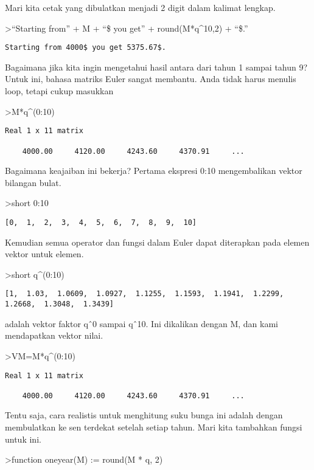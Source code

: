 \documentclass[
]{book}
\begin{document}
Mari kita cetak yang dibulatkan menjadi 2 digit dalam kalimat lengkap.

\textgreater{}``Starting from'' + M + ``\$ you get'' + round(M*q\^{}10,2) + ``\$.''

\begin{verbatim}
Starting from 4000$ you get 5375.67$.
\end{verbatim}

Bagaimana jika kita ingin mengetahui hasil antara dari tahun 1 sampai tahun 9? Untuk ini, bahasa matriks Euler sangat membantu. Anda tidak harus menulis loop, tetapi cukup masukkan

\textgreater M*q\^{}(0:10)

\begin{verbatim}
Real 1 x 11 matrix

    4000.00     4120.00     4243.60     4370.91     ...
\end{verbatim}

Bagaimana keajaiban ini bekerja? Pertama ekspresi 0:10 mengembalikan vektor bilangan bulat.

\textgreater short 0:10

\begin{verbatim}
[0,  1,  2,  3,  4,  5,  6,  7,  8,  9,  10]
\end{verbatim}

Kemudian semua operator dan fungsi dalam Euler dapat diterapkan pada elemen vektor untuk elemen.

\textgreater short q\^{}(0:10)

\begin{verbatim}
[1,  1.03,  1.0609,  1.0927,  1.1255,  1.1593,  1.1941,  1.2299,
1.2668,  1.3048,  1.3439]
\end{verbatim}

adalah vektor faktor qˆ0 sampai qˆ10. Ini dikalikan dengan M, dan kami mendapatkan vektor nilai.

\textgreater VM=M*q\^{}(0:10)

\begin{verbatim}
Real 1 x 11 matrix

    4000.00     4120.00     4243.60     4370.91     ...
\end{verbatim}

Tentu saja, cara realistis untuk menghitung suku bunga ini adalah dengan membulatkan ke sen terdekat setelah setiap tahun. Mari kita tambahkan fungsi untuk ini.

\textgreater function oneyear(M) := round(M * q, 2)
\end{document}
